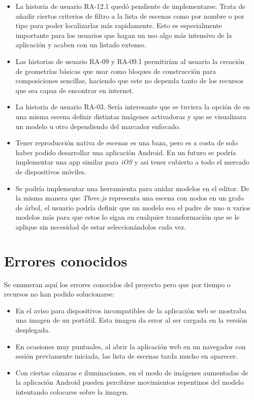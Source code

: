 \begin{itemize}
    \item La historia de usuario RA-12.1 quedó pendiente de implementarse. Trata de añadir ciertos criterios de filtro a la lista de escenas como por nombre o por tipo para poder localizarlas más rapidamente. Esto es especialmente importante para los usuarios que hagan un uso algo más intensivo de la aplicación y acaben con un listado extenso.
    \item Las historias de usuario RA-09 y RA-09.1 permitirían al usuario la creación de geometrías básicas que usar como bloques de construcción para composiciones sencillas, haciendo que este no dependa tanto de los recursos que sea capaz de encontrar en internet.
    \item La historia de usuario RA-03. Sería interesante que se tuviera la opción de en una misma escena definir distintas imágenes activadoras y que se visualizara un modelo u otro dependiendo del marcador enfocado.
    \item Tener reproducción nativa de escenas es una baza, pero es a costa de solo haber podido desarrollar una aplicación Android. En un futuro se podría implementar una app similar para \textit{iOS} y así tener cubierto a todo el mercado de dispositivos móviles.
    \item Se podría implementar una herramienta para anidar modelos en el editor. De la misma manera que \textit{Three.js} representa una escena con nodos en un grafo de árbol, el usuario podría definir que un modelo sea el padre de uno u varios modelos más para que estos lo sigan en cualquier transformación que se le aplique sin necesidad de estar seleccionándolos cada vez.
\end{itemize}

\section{Errores conocidos}

Se enumeran aquí los errores conocidos del proyecto pero que por tiempo o recursos no han podido solucionarse:

\begin{itemize}
    \item En el aviso para dispositivos incompatibles de la aplicación web se mostraba una imagen de un portátil. Esta imagen da error al ser cargada en la versión desplegada.
    \item En ocasiones muy puntuales, al abrir la aplicación web en un navegador con sesión previamente iniciada, las lista de escenas tarda mucho en aparecer.
    \item Con ciertas cámaras e iluminaciones, en el modo de imágenes aumentadas de la aplicación Android pueden percibirse movimientos repentinos del modelo intentando colocarse sobre la imagen.
\end{itemize}